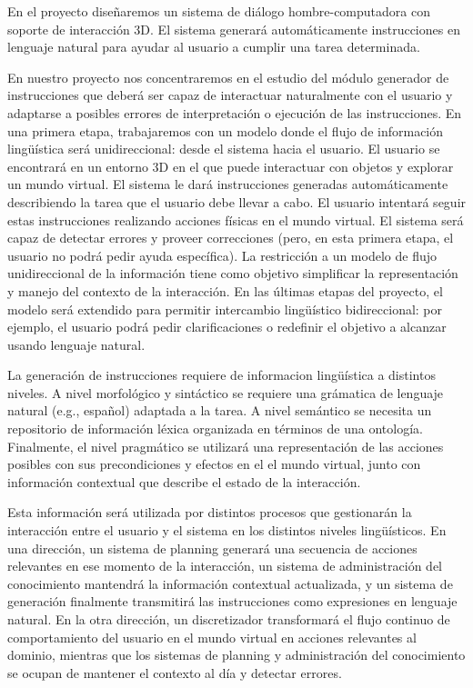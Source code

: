 En el proyecto dise\~naremos un sistema de di\'alogo hombre-computadora con
soporte de interacci\'on 3D.  El sistema generar\'a autom\'aticamente
instrucciones en lenguaje natural para ayudar al usuario a cumplir una tarea determinada.

En nuestro proyecto nos concentraremos en el estudio del m\'odulo generador de instrucciones que deber\'a ser capaz de interactuar naturalmente
con el usuario y adaptarse a posibles errores de interpretaci\'on o
ejecuci\'on de las instrucciones.  En una primera etapa, trabajaremos
con un modelo donde el flujo de informaci\'on ling\"u\'istica ser\'a unidireccional:
desde el sistema hacia el usuario.  El usuario se encontrar\'a en un entorno 3D
en el que puede interactuar con objetos y explorar un mundo virtual. El sistema
le dar\'a instrucciones generadas autom\'aticamente describiendo la tarea que el usuario debe llevar a cabo.  El usuario intentar\'a seguir estas instrucciones
realizando acciones f\'isicas en el mundo virtual.  El sistema ser\'a capaz de detectar errores y proveer correcciones (pero, en esta primera etapa,
el usuario no podr\'a pedir ayuda espec\'ifica).  La restricci\'on a un
modelo de flujo unidireccional de la informaci\'on tiene como objetivo
simplificar la representaci\'on y manejo del contexto de la interacci\'on.
En las \'ultimas etapas del proyecto, el modelo ser\'a extendido para
permitir intercambio ling\"u\'istico bidireccional: por ejemplo, el usuario podr\'a
pedir clarificaciones o redefinir el objetivo a alcanzar usando lenguaje natural.

La generaci\'on de instrucciones requiere de informacion ling\"u\'istica a
distintos niveles. A nivel morfol\'ogico y sint\'actico se requiere una
gr\'amatica de lenguaje natural (e.g., espa\~nol) adaptada a la tarea.
A nivel sem\'antico se necesita un repositorio
de informaci\'on l\'exica organizada en t\'erminos de una ontolog\'ia.
Finalmente, el nivel pragm\'atico se utilizar\'a una representaci\'on de las
acciones posibles con sus precondiciones y efectos en el el mundo virtual,
junto con informaci\'on contextual que describe el estado de la interacci\'on.

Esta informaci\'on ser\'a utilizada por distintos procesos que
gestionar\'an la interacci\'on entre el usuario y el sistema en los
distintos niveles ling\"u\'isticos. En una direcci\'on, un sistema de
planning generar\'a una secuencia de acciones relevantes en ese momento
de la interacci\'on, un sistema de administraci\'on del conocimiento
mantendr\'a la informaci\'on contextual actualizada, y un sistema de
generaci\'on finalmente transmitir\'a las instrucciones como expresiones
en lenguaje natural.  En la otra direcci\'on, un discretizador
transformar\'a el flujo continuo de comportamiento del usuario
en el mundo virtual en acciones relevantes al dominio, mientras que
los sistemas de planning y administraci\'on del conocimiento se ocupan
de mantener el contexto al d\'ia y detectar errores.


